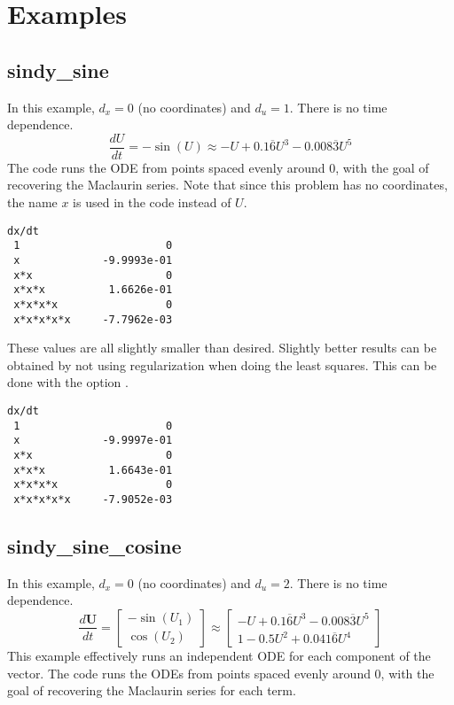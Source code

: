 \documentclass{article}
\let\vec\mathbf
\def\lstinline#1{}%
\begin{document}
\pagebreak
\section{Examples}

\subsection{sindy\_sine}
In this example, $d_x = 0$ (no coordinates) and $d_u = 1$. There is no time dependence.
\begin{equation*}
\frac{dU}{dt} = -\sin(U) \approx -U + 0.1\overline{6}U^3 - 0.008\overline{3}U^5
\end{equation*}
The code runs the ODE from points spaced evenly around 0, with the goal of
recovering the Maclaurin series. Note that since this problem has no
coordinates, the name $x$ is used in the code instead of $U$.
\begin{lstlisting}[language={}]
                    dx/dt
 1                       0
 x             -9.9993e-01
 x*x                     0
 x*x*x          1.6626e-01
 x*x*x*x                 0
 x*x*x*x*x     -7.7962e-03
\end{lstlisting}
These values are all slightly smaller than desired. Slightly better results can
be obtained by not using regularization when doing the least squares. This can
be done with the option \lstinline{-tao_brgn_regularizer_weight 0}.
\begin{lstlisting}[language={}]
                    dx/dt
 1                       0
 x             -9.9997e-01
 x*x                     0
 x*x*x          1.6643e-01
 x*x*x*x                 0
 x*x*x*x*x     -7.9052e-03
\end{lstlisting}


\subsection{sindy\_sine\_cosine}
In this example, $d_x = 0$ (no coordinates) and $d_u = 2$. There is no time dependence.
\begin{equation*}
\frac{d\vec{U}}{dt} =
\begin{bmatrix}
-\sin(U_1) \\ \cos(U_2)
\end{bmatrix}
\approx
\begin{bmatrix}
 -U + 0.1\overline{6}U^3 - 0.008\overline{3}U^5 \\  1 - 0.5U^2 +  0.041\overline{6}U^4
\end{bmatrix}
\end{equation*}
This example effectively runs an independent ODE for each component of the vector.
The code runs the ODEs from points spaced evenly around 0, with the goal of
recovering the Maclaurin series for each term.
\end{document}
